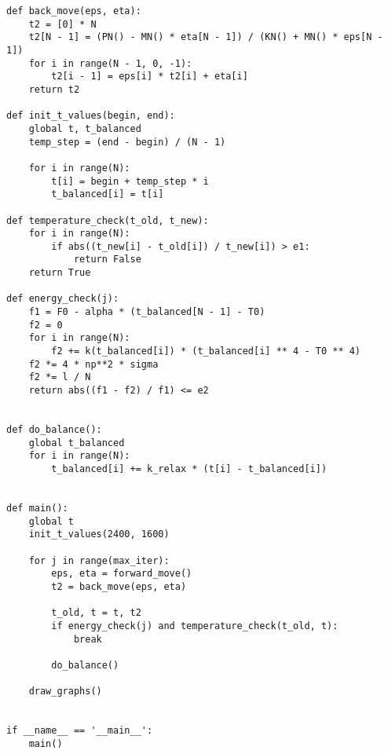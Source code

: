 \begin{lstlisting}[label=code1, caption = Лабораторная работа №3]
def back_move(eps, eta):
	t2 = [0] * N
	t2[N - 1] = (PN() - MN() * eta[N - 1]) / (KN() + MN() * eps[N - 1])
	for i in range(N - 1, 0, -1):
		t2[i - 1] = eps[i] * t2[i] + eta[i]
	return t2

def init_t_values(begin, end):
	global t, t_balanced
	temp_step = (end - begin) / (N - 1)
	
	for i in range(N):
		t[i] = begin + temp_step * i
		t_balanced[i] = t[i]

def temperature_check(t_old, t_new):
	for i in range(N):
		if abs((t_new[i] - t_old[i]) / t_new[i]) > e1:
			return False
	return True

def energy_check(j):
	f1 = F0 - alpha * (t_balanced[N - 1] - T0)
	f2 = 0
	for i in range(N):
		f2 += k(t_balanced[i]) * (t_balanced[i] ** 4 - T0 ** 4)
	f2 *= 4 * np**2 * sigma
	f2 *= l / N
	return abs((f1 - f2) / f1) <= e2


def do_balance():
	global t_balanced
	for i in range(N):
		t_balanced[i] += k_relax * (t[i] - t_balanced[i])


def main():
	global t
	init_t_values(2400, 1600)
	
	for j in range(max_iter):
		eps, eta = forward_move()
		t2 = back_move(eps, eta)
		
		t_old, t = t, t2
		if energy_check(j) and temperature_check(t_old, t):
			break
		
		do_balance()
	
	draw_graphs()


if __name__ == '__main__':
	main()
\end{lstlisting}